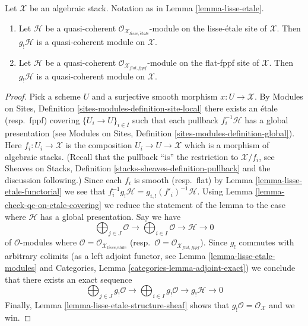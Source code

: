 \begin{lemma}
\label{lemma-shriek-quasi-coherent}
Let $\mathcal{X}$ be an algebraic stack. Notation as in
Lemma \ref{lemma-lisse-etale}.
\begin{enumerate}
\item Let $\mathcal{H}$ be a quasi-coherent
$\mathcal{O}_{\mathcal{X}_{lisse,\acute{e}tale}}$-module 
on the lisse-\'etale site of $\mathcal{X}$. Then $g_!\mathcal{H}$ is a
quasi-coherent module on $\mathcal{X}$.
\item Let $\mathcal{H}$ be a quasi-coherent
$\mathcal{O}_{\mathcal{X}_{flat,fppf}}$-module 
on the flat-fppf site of $\mathcal{X}$. Then $g_!\mathcal{H}$ is a
quasi-coherent module on $\mathcal{X}$.
\end{enumerate}
\end{lemma}

\begin{proof}
Pick a scheme $U$ and a surjective smooth morphism $x : U \to \mathcal{X}$.
By
Modules on Sites, Definition \ref{sites-modules-definition-site-local}
there exists an \'etale (resp.\ fppf) covering
$\{U_i \to U\}_{i \in I}$ such that each pullback $f_i^{-1}\mathcal{H}$
has a global presentation (see
Modules on Sites, Definition \ref{sites-modules-definition-global}).
Here $f_i : U_i \to \mathcal{X}$ is the composition
$U_i \to U \to \mathcal{X}$ which is a morphism of algebraic stacks.
(Recall that the pullback ``is'' the restriction to $\mathcal{X}/f_i$, see
Sheaves on Stacks, Definition \ref{stacks-sheaves-definition-pullback}
and the discussion following.) Since each $f_i$ is smooth (resp.\ flat) by
Lemma \ref{lemma-lisse-etale-functorial}
we see that $f_i^{-1}g_!\mathcal{H} = g_{i, !}(f'_i)^{-1}\mathcal{H}$.
Using Lemma \ref{lemma-check-qc-on-etale-covering}
we reduce the statement of the lemma to the case where $\mathcal{H}$
has a global presentation. Say we have
$$
\bigoplus\nolimits_{j \in J} \mathcal{O} \longrightarrow
\bigoplus\nolimits_{i \in I} \mathcal{O} \longrightarrow
\mathcal{H} \longrightarrow 0
$$
of $\mathcal{O}$-modules where
$\mathcal{O} = \mathcal{O}_{\mathcal{X}_{lisse,\acute{e}tale}}$
(resp.\ $\mathcal{O} = \mathcal{O}_{\mathcal{X}_{flat,fppf}}$).
Since $g_!$ commutes with arbitrary colimits (as a left adjoint functor, see
Lemma \ref{lemma-lisse-etale-modules} and
Categories, Lemma \ref{categories-lemma-adjoint-exact})
we conclude that there exists an exact sequence
$$
\bigoplus\nolimits_{j \in J} g_!\mathcal{O} \longrightarrow
\bigoplus\nolimits_{i \in I} g_!\mathcal{O} \longrightarrow
g_!\mathcal{H} \longrightarrow 0
$$
Finally, Lemma \ref{lemma-lisse-etale-structure-sheaf}
shows that $g_!\mathcal{O} = \mathcal{O}_\mathcal{X}$
and we win.
\end{proof}

